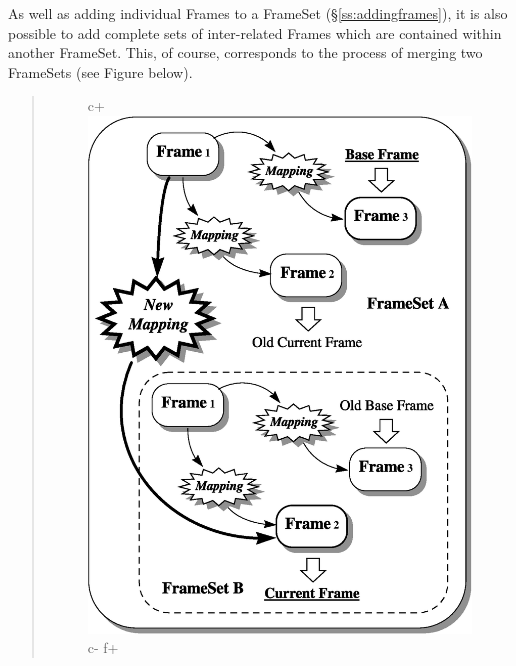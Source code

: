 \documentclass[twoside,11pt]{article}
\newcommand{\secref}[1]{\S\ref{#1}}
\newcommand{\secref}[1]{\ref{#1}}
\begin{document}
\begin{htmlonly}
   As well as adding individual Frames to a FrameSet
   (\secref{ss:addingframes}), it is also possible to add complete sets of
   inter-related Frames which are contained within another
   FrameSet. This, of course, corresponds to the process of merging two
   FrameSets (see Figure below).
   \begin{quote}
   \begin{figure}[hbtp]
   \label{fig:fsmerge}
c+
   \includegraphics[scale=0.75]{sun211_figures/fsmerge.eps}
c-
f+

\end{figure}
\end{quote}
\end{htmlonly}
\end{document}
